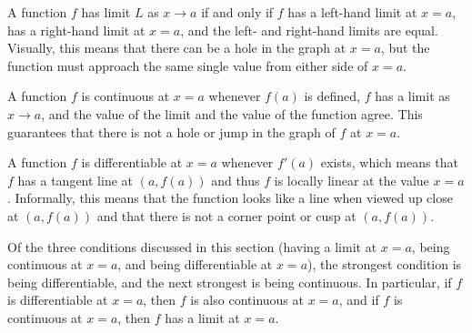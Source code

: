 \begin{summary}
\item A function $f$ has limit $L$ as $x \to a$ if and only if $f$ has a left-hand limit at $x = a$, has a right-hand limit at $x = a$, and the left- and right-hand limits are equal.  Visually, this means that there can be a hole in the graph at $x = a$, but the function must approach the same single value from either side of $x = a$.
\item A function $f$ is continuous at $x = a$ whenever $f(a)$ is defined, $f$ has a limit as $x \to a$, and the value of the limit and the value of the function agree.  This guarantees that there is not a hole or jump in the graph of $f$ at $x = a$.
\item A function $f$ is differentiable at $x = a$ whenever $f'(a)$ exists, which means that $f$ has a tangent line at $(a,f(a))$ and thus $f$ is locally linear at the value $x = a$.  Informally, this means that the function looks like a line when viewed up close at $(a,f(a))$ and that there is not a corner point or cusp at $(a,f(a))$. 
\item Of the three conditions discussed in this section (having a limit at $x = a$, being continuous at $x = a$, and being differentiable at $x = a$), the strongest condition is being differentiable, and the next strongest is being continuous.  In particular, if $f$ is differentiable at $x = a$, then $f$ is also continuous at $x = a$, and if $f$ is continuous at $x = a$, then $f$ has a limit at $x = a$.
\end{summary}

\nin \hrulefill

 

\clearpage